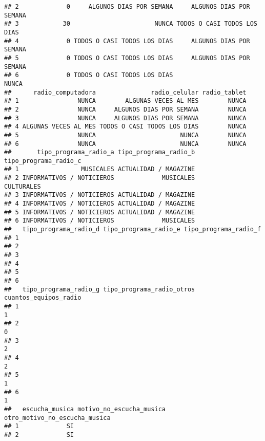 \documentclass[
]{article}
\begin{document}
\begin{verbatim}
## 2             0     ALGUNOS DIAS POR SEMANA     ALGUNOS DIAS POR SEMANA
## 3            30                       NUNCA TODOS O CASI TODOS LOS DIAS
## 4             0 TODOS O CASI TODOS LOS DIAS     ALGUNOS DIAS POR SEMANA
## 5             0 TODOS O CASI TODOS LOS DIAS     ALGUNOS DIAS POR SEMANA
## 6             0 TODOS O CASI TODOS LOS DIAS                       NUNCA
##      radio_computadora               radio_celular radio_tablet
## 1                NUNCA        ALGUNAS VECES AL MES        NUNCA
## 2                NUNCA     ALGUNOS DIAS POR SEMANA        NUNCA
## 3                NUNCA     ALGUNOS DIAS POR SEMANA        NUNCA
## 4 ALGUNAS VECES AL MES TODOS O CASI TODOS LOS DIAS        NUNCA
## 5                NUNCA                       NUNCA        NUNCA
## 6                NUNCA                       NUNCA        NUNCA
##       tipo_programa_radio_a tipo_programa_radio_b tipo_programa_radio_c
## 1                 MUSICALES ACTUALIDAD / MAGAZINE                      
## 2 INFORMATIVOS / NOTICIEROS             MUSICALES            CULTURALES
## 3 INFORMATIVOS / NOTICIEROS ACTUALIDAD / MAGAZINE                      
## 4 INFORMATIVOS / NOTICIEROS ACTUALIDAD / MAGAZINE                      
## 5 INFORMATIVOS / NOTICIEROS ACTUALIDAD / MAGAZINE                      
## 6 INFORMATIVOS / NOTICIEROS             MUSICALES                      
##   tipo_programa_radio_d tipo_programa_radio_e tipo_programa_radio_f
## 1                                                                  
## 2                                                                  
## 3                                                                  
## 4                                                                  
## 5                                                                  
## 6                                                                  
##   tipo_programa_radio_g tipo_programa_radio_otros cuantos_equipos_radio
## 1                                                                     1
## 2                                                                     0
## 3                                                                     2
## 4                                                                     2
## 5                                                                     1
## 6                                                                     1
##   escucha_musica motivo_no_escucha_musica otro_motivo_no_escucha_musica
## 1             SI                                                       
## 2             SI                                                       

\end{verbatim}
\end{document}
